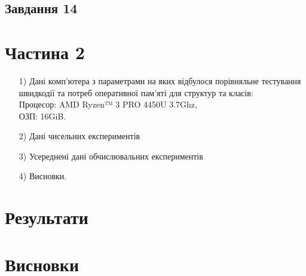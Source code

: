 \documentclass[oneside,14pt]{extarticle}
\begin{document}
\begin{normalsize}
	\subsection*{Завдання 14}
	
	\section*{Частина 2}
	\begin{enumerate}
		\item[1)] Дані комп'ютера з параметрами на яких відбулося порівняльне тестування швидкодії та потреб оперативної пам'яті для структур та класів:\\
		Процесор: AMD Ryzen™ 3 PRO 4450U 3.7Ghz, \\ОЗП: 16GiB.
		
		\item[2)] Дані чисельних експериментів
		
		\item[3)] Усереднені дані обчислювальних експериментів
		
		\item[4)] Висновки. 
	\end{enumerate}
	
	\section*{Результати}

	\section*{Висновки}

	    
\end{normalsize}
\end{document}
